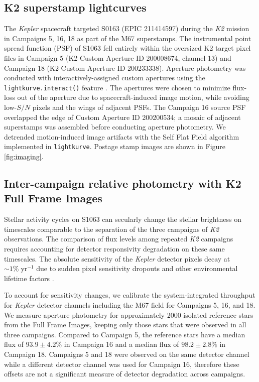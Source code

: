 \documentclass[twocolumn]{emulateapj}%
\begin{document}
\subsection{K2 superstamp lightcurves}
The \emph{Kepler} spacecraft targeted S0163 (EPIC 211414597) during the \emph{K2} mission \citep{howell14} in Campaigns 5, 16, 18 as part of the M67 superstamps.  The instrumental point spread function (PSF) of S1063 fell entirely within the oversized K2 target pixel files in Campaign 5 (K2 Custom Aperture ID 200008674, channel 13) and Campaign 18 (K2 Custom Aperture ID 200233338).  Aperture photometry was conducted with interactively-assigned custom apertures using the \texttt{lightkurve.interact()} feature \citep{geert_barentsen_2019_2565212}. The apertures were chosen to minimize flux-loss out of the aperture due to spacecraft-induced image motion, while avoiding low-$S/N$ pixels and the wings of adjacent PSFs.  The Campaign 16 source PSF overlapped the edge of Custom Aperture ID 200200534; a mosaic of adjacent superstamps was assembled before conducting aperture photometry.
We detrended motion-induced image artifacts with the Self Flat Field algorithm \citep{vanderburg14} implemented in \texttt{lightkurve}.  Postage stamp images are shown in Figure \ref{fig:imaging}.

\subsection{Inter-campaign relative photometry with K2 Full Frame Images}\label{K2lightcurve}

Stellar activity cycles on S1063 can secularly change the stellar brightness on timescales comparable to the separation of the three campaigns of \emph{K2} observations.  The comparison of flux levels among repeated \emph{K2} campaigns requires accounting for detector responsivity degradation on these same timescales.  The absolute sensitivity of the \emph{Kepler} detector pixels decay at $\sim1 \%\;\textrm{yr}^{-1}$ due to sudden pixel sensitivity dropouts and other environmental lifetime factors \citep{montet17}.

To account for sensitivity changes, we calibrate the system-integrated throughput for \emph{Kepler} detector channels including the M67 field for Campaigns 5, 16, and 18. We measure aperture photometry for approximately 2000 isolated reference stars from the Full Frame Images, keeping only those stars that were observed in all three campaigns. Compared to Campaign 5, the reference stars have a median flux of $93.9\pm4.2\%$ in Campaign 16 and a median flux of $98.2\pm2.8\%$ in Campaign 18. Campaigns 5 and 18 were observed on the same detector channel while a different detector channel was used for Campaign 16, therefore these offsets are not a significant measure of detector degradation across campaigns.
\end{document}
